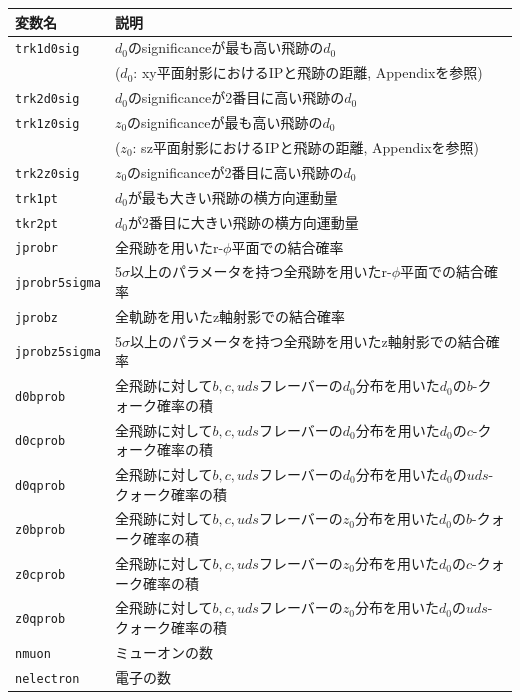 \begin{table}[H]
 \centering
 \small
  \begin{tabular}{ l | l }
   \hline
   変数名 & 説明\\
   \hline \hline
   \texttt{trk1d0sig} & $d_0$のsignificanceが最も高い飛跡の$d_0$ \\
   & ($d_0$: xy平面射影におけるIPと飛跡の距離, Appendixを参照)\\
   \texttt{trk2d0sig} & $d_0$のsignificanceが2番目に高い飛跡の$d_0$\\
   \texttt{trk1z0sig} & $z_0$のsignificanceが最も高い飛跡の$d_0$ \\
   & ($z_0$: sz平面射影におけるIPと飛跡の距離, Appendixを参照)\\
   \texttt{trk2z0sig} & $z_0$のsignificanceが2番目に高い飛跡の$d_0$\\
   \texttt{trk1pt} & $d_0$が最も大きい飛跡の横方向運動量\\
   \texttt{tkr2pt} & $d_0$が2番目に大きい飛跡の横方向運動量\\
   \texttt{jprobr} & 全飛跡を用いたr-$\phi$平面での結合確率\\
   \texttt{jprobr5sigma} & 5$\sigma$以上のパラメータを持つ全飛跡を用いたr-$\phi$平面での結合確率\\
   \texttt{jprobz} & 全軌跡を用いたz軸射影での結合確率\\
   \texttt{jprobz5sigma} & 5$\sigma$以上のパラメータを持つ全飛跡を用いたz軸射影での結合確率\\
   \texttt{d0bprob} & 全飛跡に対して$b,c,uds$フレーバーの$d_0$分布を用いた$d_0$の$b$-クォーク確率の積\\
   \texttt{d0cprob} & 全飛跡に対して$b,c,uds$フレーバーの$d_0$分布を用いた$d_0$の$c$-クォーク確率の積\\
   \texttt{d0qprob} & 全飛跡に対して$b,c,uds$フレーバーの$d_0$分布を用いた$d_0$の$uds$-クォーク確率の積\\
   \texttt{z0bprob} & 全飛跡に対して$b,c,uds$フレーバーの$z_0$分布を用いた$d_0$の$b$-クォーク確率の積\\
   \texttt{z0cprob} & 全飛跡に対して$b,c,uds$フレーバーの$z_0$分布を用いた$d_0$の$c$-クォーク確率の積\\
   \texttt{z0qprob} & 全飛跡に対して$b,c,uds$フレーバーの$z_0$分布を用いた$d_0$の$uds$-クォーク確率の積\\
   \texttt{nmuon} & ミューオンの数\\
   \texttt{nelectron} & 電子の数\\

\end{tabular}
\end{table}
